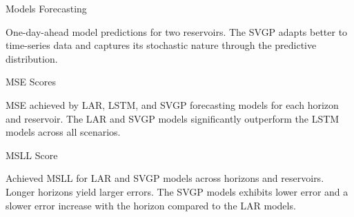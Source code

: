 \begin{frame}{Models Forecasting}
	\centering
	\begin{figure}[htbp]
		\tiny
		\setlength{} 
		\setlength{}
		
		\subfloat[$A$.]{}
		\subfloat[$I$.]{}
	\end{figure}
	\vspace{-1.5em}
	\begin{block}{}
	One-day-ahead model predictions for two reservoirs. The SVGP adapts better to time-series data and captures its stochastic nature through the predictive distribution.
	\end{block}
\end{frame}


\begin{frame}{MSE Scores}
	\begin{figure}[htbp]
		\setlength{} 
		\setlength{}
		\subfloat[LAR.]{}\hspace{-1.5em}
		\subfloat[LSTM.]{}\hspace{-1.5em}
		\subfloat[SVGP.]{}
	\end{figure}
	\vspace{-1.5em}
	\begin{block}{}
	MSE achieved by LAR, LSTM, and SVGP forecasting models for each horizon and reservoir. The LAR and SVGP models significantly outperform the LSTM models across all scenarios.
	\end{block}
\end{frame}

\begin{frame}{MSLL Score}
	\begin{figure}[htbp]
		\setlength{} 
		\setlength{}
		\subfloat[LAR.]{}\hspace{-1.5em}
		\subfloat[SVGP.]{}
	\end{figure}
	\vspace{-1.8em}
	\begin{block}{}
	Achieved MSLL for LAR and SVGP models across horizons and reservoirs. Longer horizons yield larger errors. The SVGP models exhibits lower error and a slower error increase with the horizon compared to the LAR models.
	\end{block}
\end{frame}

